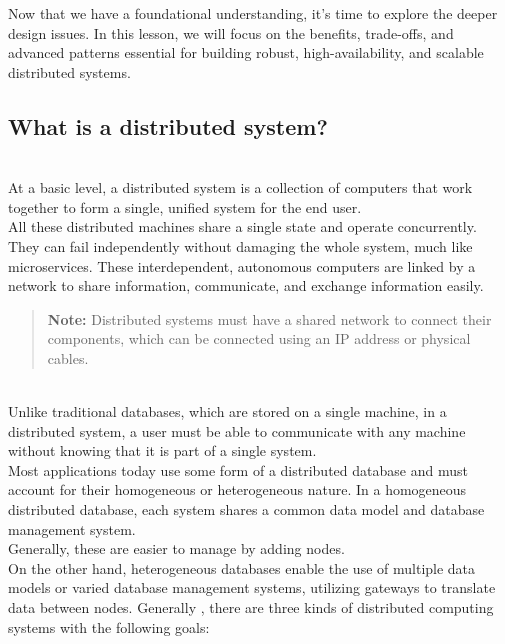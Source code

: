 

Now that we have a foundational understanding, it's time to explore the deeper design issues. In this lesson, we will focus on the benefits, trade-offs, and advanced patterns essential for building robust, high-availability, and scalable distributed systems.

\subsection{What is a distributed system?}\label{UywOpN0BfkU6pNk0wh4FV}
\\
At a basic level, a distributed system is a collection of computers that work together to form a single, unified system for the end user.
\\
All these distributed machines share a single state and operate concurrently. They can fail independently without damaging the whole system, much like microservices. These interdependent, autonomous computers are linked by a network to share information, communicate, and exchange information easily.
\begin{quote}
\textbf{Note:} Distributed systems must have a shared network to connect their components, which can be connected using an IP address or physical cables.
\end{quote}
\\
Unlike traditional databases, which are stored on a single machine, in a distributed system, a user must be able to communicate with any machine without knowing that it is part of a single system.
\\
Most applications today use some form of a distributed database and must account for their homogeneous or heterogeneous nature. In a homogeneous distributed database, each system shares a common data model and database management system.
\\
Generally, these are easier to manage by adding nodes.
\\
On the other hand, heterogeneous databases enable the use of multiple data models or varied database management systems, utilizing gateways to translate data between nodes. Generally , there are three kinds of distributed computing systems with the following goals:

